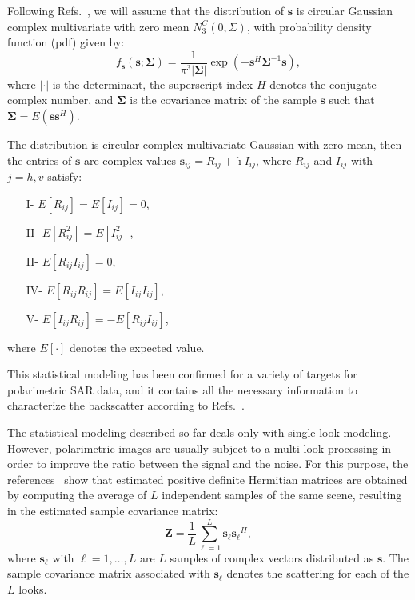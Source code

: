 \documentclass[conference]{IEEEtran}
\begin{document}
Following Refs.~\cite{good, lee}, we will assume that the distribution of $\mathbf{s}$ is circular Gaussian complex multivariate with zero mean $N^C_3(0,\Sigma)$, with probability density function (pdf) given by:
\begin{equation}
    f_{\mathbf{s}}(\mathbf{s};\mathbf{\Sigma})=\frac{1}{\pi^3|\mathbf{\Sigma}|} \exp(-\mathbf{s}^H\mathbf{\Sigma}^{-1}\mathbf{s}),
    \label{eq_03}
\end{equation}
where $|\cdot|$ is the determinant, 
the superscript index $H$ denotes the conjugate complex number, 
and $\mathbf{\Sigma}$ is the covariance matrix of the sample $\mathbf{s}$ such that $\mathbf{\Sigma}=E(\mathbf{ss}^H)$. 

The distribution is circular complex multivariate Gaussian with zero mean, then the entries of $\mathbf{s}$ are complex values $\mathbf{s}_{ij}= R_{ij}+ \hat{\imath} I_{ij}$, where $R_{ij}$ and $I_{ij}$ with $j=h,v$ satisfy:
\begin{itemize}
	\item[I-] $E[R_{ij}]=E[I_{ij}]=0$,
	\item[II-] $E[R_{ij}^2]=E[I_{ij}^2]$, 
	\item[II-] $E[R_{ij}I_{ij}]=0$,  
	\item[IV-] $E[R_{ij}R_{ij}]=E[I_{ij}I_{ij}]$, 
	\item[V-] $E[I_{ij}R_{ij}]=-E[R_{ij}I_{ij}]$,
\end{itemize}
where $E[\cdot]$ denotes the expected value. 

This statistical modeling has been confirmed for a variety of targets for polarimetric SAR data, and it contains all the necessary information to characterize the backscatter according to Refs.~\cite{sarabendi,mfp}.
 
The statistical modeling described so far deals only with single-look modeling.
However, polarimetric images are usually subject to a multi-look processing in order to improve the ratio between the signal and the noise. For this purpose, the references~\cite{good, ade} show that estimated positive definite Hermitian matrices are obtained by computing the average of $L$ independent samples of the same scene, resulting in the estimated sample covariance matrix:
\begin{equation}
    \mathbf{Z}=\frac{1}{L}\sum_{\ell=1}^{L} {\mathbf{s}_\ell}{\mathbf{s}_\ell}^H,
    \label{eq_04}
\end{equation}
where $\mathbf{s}_\ell$ with $\ell = 1, \dots, L$ are $L$ samples of complex vectors distributed as $\mathbf{s}$. The sample covariance matrix associated with $\mathbf{s}_\ell$ denotes the scattering for each of the $L$ looks.
\end{document}
